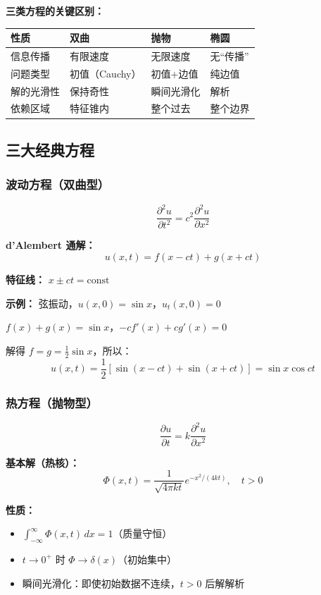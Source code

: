 \textbf{三类方程的关键区别：}

\begin{center}
\begin{tabular}{p{2.5cm}p{3.5cm}p{3.5cm}p{3.5cm}}
\toprule
\textbf{性质} & \textbf{双曲} & \textbf{抛物} & \textbf{椭圆} \\
\midrule
信息传播 & 有限速度 & 无限速度 & 无“传播” \\
问题类型 & 初值（Cauchy） & 初值+边值 & 纯边值 \\
解的光滑性 & 保持奇性 & 瞬间光滑化 & 解析 \\
依赖区域 & 特征锥内 & 整个过去 & 整个边界 \\
\bottomrule
\end{tabular}
\end{center}

\subsection{三大经典方程}

\subsubsection{波动方程（双曲型）}

\[
\frac{\partial^2 u}{\partial t^2} = c^2 \frac{\partial^2 u}{\partial x^2}
\]

\textbf{d'Alembert 通解：}
\[
u(x,t) = f(x - ct) + g(x + ct)
\]

\textbf{特征线：} $x \pm ct = \text{const}$

\textbf{示例：} 弦振动，$u(x,0) = \sin x$，$u_t(x,0) = 0$

$f(x) + g(x) = \sin x$，$-cf'(x) + cg'(x) = 0$

解得 $f = g = \frac{1}{2}\sin x$，所以：
\[
u(x,t) = \frac{1}{2}[\sin(x-ct) + \sin(x+ct)] = \sin x \cos ct
\]

\subsubsection{热方程（抛物型）}

\[
\frac{\partial u}{\partial t} = k\frac{\partial^2 u}{\partial x^2}
\]

\textbf{基本解（热核）：}
\[
\Phi(x,t) = \frac{1}{\sqrt{4\pi kt}} e^{-x^2/(4kt)}, \quad t > 0
\]

\textbf{性质：}
\begin{itemize}
  \item $\int_{-\infty}^{\infty} \Phi(x,t)\,dx = 1$（质量守恒）
  \item $t \to 0^+$ 时 $\Phi \to \delta(x)$（初始集中）
  \item 瞬间光滑化：即使初始数据不连续，$t > 0$ 后解解析
\end{itemize}

